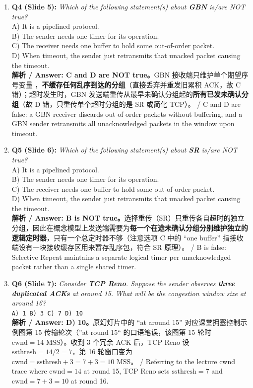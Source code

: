 \begin{enumerate}
\item \textbf{Q4 (Slide 5):} \emph{Which of the following statement(s) about \textbf{GBN} is/are NOT true?} \\
A) It is a pipelined protocol. \\
B) The sender needs one timer for its operation. \\
C) The receiver needs one buffer to hold some out-of-order packet. \\
D) When timeout, the sender just retransmits that unacked packet causing the timeout. \\
\textbf{解析 / Answer: C and D are NOT true。}GBN 接收端只维护单个期望序号变量 ，\textbf{不缓存任何乱序到达的分组}（直接丢弃并重发旧累积 ACK，故 C 错）；超时发生时，GBN 发送端重传从最早未确认分组起的\textbf{所有已发未确认分组}（故 D 错，只重传单个超时分组的是 SR 或简化 TCP）。 / C and D are false: a GBN receiver discards out-of-order packets without buffering, and a GBN sender retransmits all unacknowledged packets in the window upon timeout.

\item \textbf{Q5 (Slide 6):} \emph{Which of the following statement(s) about \textbf{SR} is/are NOT true?} \\
A) It is a pipelined protocol. \\
B) The sender needs one timer for its operation. \\
C) The receiver needs one buffer to hold some out-of-order packet. \\
D) When timeout, the sender just retransmits that unacked packet causing the timeout. \\
\textbf{解析 / Answer: B is NOT true。}选择重传（SR）只重传各自超时的独立分组，因此在概念模型上发送端需要为\textbf{每一个在途未确认分组分别维护独立的逻辑定时器}，只有一个总定时器不够（注意选项 C 中的 ``one buffer'' 指接收端设有一块接收缓存区用来暂存乱序包，符合 SR 原理）。 / B is false: Selective Repeat maintains a separate logical timer per unacknowledged packet rather than a single shared timer.

\item \textbf{Q6 (Slide 7):} \emph{Consider \textbf{TCP Reno}. Suppose the sender observes \textbf{three duplicated ACKs} at around 15. What will be the congestion window size at around 16?} \\
\texttt{A) 1 \quad B) 3 \quad C) 7 \quad D) 10} \\
\textbf{解析 / Answer: D) 10。}原幻灯片中的 ``at around 15'' 对应课堂拥塞控制示例图第 15 传输轮次（”at round 15“ 的口语笔误，该图第 15 轮时 $\mathrm{cwnd} = 14\text{ MSS}$）。收到 3 个冗余 ACK 后，TCP Reno 设 $\mathrm{ssthresh} = 14 / 2 = 7$，第 16 轮窗口变为 $\mathrm{cwnd} = \mathrm{ssthresh} + 3 = 7 + 3 = 10\text{ MSS}$。 / Referring to the lecture cwnd trace where $\mathrm{cwnd}=14$ at round 15, TCP Reno sets $\mathrm{ssthresh}=7$ and $\mathrm{cwnd}=7+3=10$ at round 16.


\end{enumerate}
